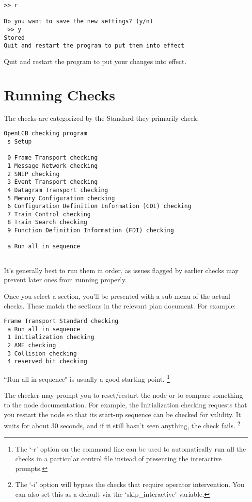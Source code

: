\begin{verbatim}
>> r

Do you want to save the new settings? (y/n)
 >> y
Stored
Quit and restart the program to put them into effect
\end{verbatim}

Quit and restart the program to put your changes into effect.

\section{Running Checks}

The checks are categorized by the Standard they primarily check:

\begin{verbatim}
OpenLCB checking program
 s Setup

 0 Frame Transport checking
 1 Message Network checking
 2 SNIP checking
 3 Event Transport checking
 4 Datagram Transport checking
 5 Memory Configuration checking
 6 Configuration Definition Information (CDI) checking
 7 Train Control checking
 8 Train Search checking
 9 Function Definition Information (FDI) checking
  
 a Run all in sequence
 
\end{verbatim}

It's generally best to run them in order, as issues flagged by earlier
checks may prevent later ones from running properly.

Once you select a section, you'll be presented with a sub-menu of the
actual checks.  These match the sections in the relevant plan document.
For example:

\begin{verbatim}
Frame Transport Standard checking
 a Run all in sequence
 1 Initialization checking
 2 AME checking
 3 Collision checking
 4 reserved bit checking
\end{verbatim}

``Run all in sequence" is usually a good starting point.
\footnote{
    The `-r' option on the command line can be used to 
    automatically run all the checks in a particular
    control file instead of presenting the interactive prompts.
}

The checker may prompt you to reset/restart the node or to
compare something to the node documentation. For example,
the Initialization checking requests that you restart the node
so that its start-up sequence can be checked for validity.
It waits for about 30 seconds, and if it still hasn't seen anything, the
check fails.
\footnote{The `-i' option will bypass the
checks that require operator intervention.  
You can also set this as a default via the `skip\_interactive' variable.
}

